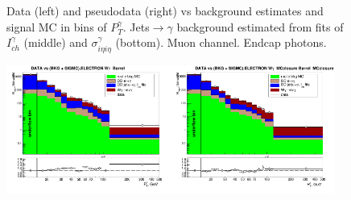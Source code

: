 \begin{figure}[htb]
\begin{center}
  \caption{Data (left) and pseudodata (right) vs background estimates and signal MC in bins of $P_T^{\gamma}$. Jets$\rightarrow\gamma$ background estimated from fits of $I_{ch}^{\gamma}$ (middle) and  $\sigma_{i\eta i\eta}^{\gamma}$ (bottom). Muon channel. Endcap photons. }
  \label{fig:DATAvsBKGandSIGMC_MCclosure_MUON_E}
  \end{center}
\end{figure}

\begin{figure}[htb]
  \begin{center}
   \includegraphics[width=0.48\textwidth]{../figs/figs_v11/ELECTRON_WGamma/PrepareYields/c_DATAvsBkgPlusSigMCc_ELECTRON_WGamma_TEMPL_CHISO_UNblind__Barrel__phoEt.png}\includegraphics[width=0.48\textwidth]{../figs/figs_v11/ELECTRON_WGamma/PrepareYields/c_DATAvsBkgPlusSigMCc_ELECTRON_WGamma_TEMPL_CHISO_UNblind_MCclosure__Barrel__phoEt_MCclosure.png}\\

\end{center}
\end{figure}
